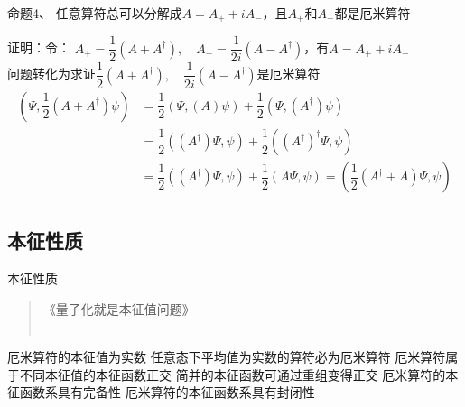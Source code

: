 \begin{frame} [allowframebreaks=]
    \frametitle{}
    \begin{tcolorbox1}{命题4、}
       任意算符总可以分解成$A=A_+ +iA_-$，且$A_+$和$A_-$都是厄米算符
    \end{tcolorbox1}
    \alert{证明：}令：
    $A_+=\dfrac{1}{2} (A+A^\dagger), \quad A_-=\dfrac{1}{2i} (A-A^\dagger) $，有$A=A_+ +iA_-$\\
    问题转化为求证$\dfrac{1}{2} (A+A^\dagger), \quad \dfrac{1}{2i} (A-A^\dagger) $是厄米算符\\
    \begin{equation*}
        \begin{split}
            (\Psi, \dfrac{1}{2} (A+A^\dagger)\psi ) &=\dfrac{1}{2}(\Psi, (A)\psi) + \dfrac{1}{2}(\Psi, (A^\dagger)\psi) \\
            &= \dfrac{1}{2}((A^\dagger)\Psi, \psi) + \dfrac{1}{2}((A^\dagger)^\dagger\Psi, \psi) \\
            &= \dfrac{1}{2}((A^\dagger)\Psi, \psi) + \dfrac{1}{2}(A\Psi, \psi)= ( \dfrac{1}{2}(A^\dagger + A) \Psi, \psi ) \\
         \end{split}
    \end{equation*}  
\end{frame} 

\subsection{本征性质}

\begin{frame}{本征性质}   
    \begin{quote}
        《量子化就是本征值问题》\\
        ~~\\
     \end{quote}
    \begin{enumerate}
        \Item 厄米算符的本征值为实数
        \Item 任意态下平均值为实数的算符必为厄米算符
        \Item 厄米算符属于不同本征值的本征函数正交
        \Item 简并的本征函数可通过重组变得正交
        \Item 厄米算符的本征函数系具有完备性
        \Item 厄米算符的本征函数系具有封闭性
    \end{enumerate}    

\end{frame} 

